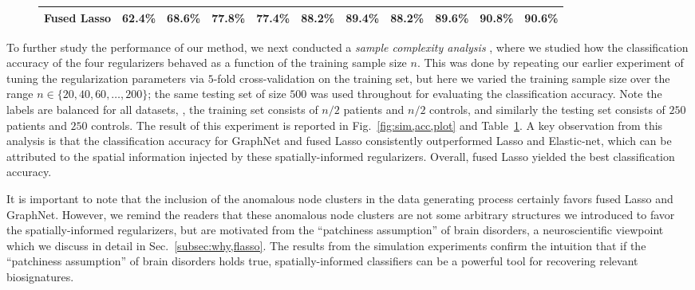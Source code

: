 \begin{figure}[!t]
\begin{minipage}{\textwidth}
\begin{tabular}{c||c|c|c|c|c|c|c|c|c|c}
		\textbf{\small{Fused Lasso}} &
			\small{62.4\%}& \textbf{\small{68.6\%}}& \textbf{\small{77.8\%}}& \textbf{\small{77.4\%}}& \textbf{\small{88.2\%}}& \textbf{\small{89.4\%}}& \textbf{\small{88.2\%}}& \textbf{\small{89.6\%}}& \textbf{\small{90.8\%}}& \textbf{\small{90.6\%}}\\
		\hline
	\end{tabular}
	\label{table:sim,acc}
\end{minipage}
\end{figure}

To further study the performance of our method, we next conducted a \emph{sample complexity analysis} \citep{Gramfort:2011}, where we studied how the classification accuracy of the four regularizers behaved as a function of the training sample size $n$.
This was done by repeating our earlier experiment of tuning the regularization parameters via $5$-fold cross-validation on the training set, but here we varied the training sample size over the range $n\in\{20,40,60,\dots,200\}$; the same testing set of size $500$ was used throughout for evaluating the classification accuracy.
Note the labels are balanced for all datasets, \ie, the training set consists of $n/2$ patients and $n/2$ controls, and similarly the testing set consists of $250$ patients and $250$ controls.
The result of this experiment is reported in Fig.~\ref{fig:sim,acc,plot} and Table~\ref{table:sim,acc}.
A key observation from this analysis is that the classification accuracy for GraphNet and fused Lasso consistently outperformed Lasso and Elastic-net, which can be attributed to the spatial information injected by these spatially-informed regularizers.
Overall, fused Lasso yielded the best classification accuracy.

It is important to note that the inclusion of the anomalous node clusters in the data generating process certainly favors fused Lasso and GraphNet.
However, we remind the readers that these anomalous node clusters are not some arbitrary structures we introduced to favor the spatially-informed regularizers, but are motivated from the ``patchiness assumption'' of brain disorders, a neuroscientific viewpoint which we discuss in detail in Sec.~\ref{subsec:why,flasso}.
The results from the simulation experiments confirm the intuition that if the ``patchiness assumption'' of brain disorders holds true, spatially-informed classifiers can be a powerful tool for recovering relevant biosignatures.

